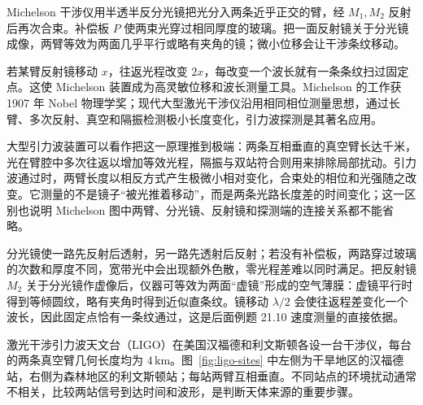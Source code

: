 Michelson 干涉仪用半透半反分光镜把光分入两条近乎正交的臂，经 $M_1,M_2$ 反射后再次合束。补偿板 $P$ 使两束光穿过相同厚度的玻璃。把一面反射镜关于分光镜成像，两臂等效为两面几乎平行或略有夹角的镜；微小位移会让干涉条纹移动。

若某臂反射镜移动 $x$，往返光程改变 $2x$，每改变一个波长就有一条条纹扫过固定点。这使 Michelson 装置成为高灵敏位移和波长测量工具。Michelson 的工作获 1907 年 Nobel 物理学奖；现代大型激光干涉仪沿用相同相位测量思想，通过长臂、多次反射、真空和隔振检测极小长度变化，引力波探测是其著名应用。

大型引力波装置可以看作把这一原理推到极端：两条互相垂直的真空臂长达千米，光在臂腔中多次往返以增加等效光程，隔振与双站符合则用来排除局部扰动。引力波通过时，两臂长度以相反方式产生极微小相对变化，合束处的相位和光强随之改变。它测量的不是镜子“被光推着移动”，而是两条光路长度差的时间变化；这一区别也说明 Michelson 图中两臂、分光镜、反射镜和探测端的连接关系都不能省略。

分光镜使一路先反射后透射，另一路先透射后反射；若没有补偿板，两路穿过玻璃的次数和厚度不同，宽带光中会出现额外色散，零光程差难以同时满足。把反射镜 $M_2$ 关于分光镜作虚像后，仪器可等效为两面“虚镜”形成的空气薄膜：虚镜平行时得到等倾圆纹，略有夹角时得到近似直条纹。镜移动 $\lambda/2$ 会使往返程差变化一个波长，因此固定点恰有一条纹通过，这是后面例题 21.10 速度测量的直接依据。

\MichelsonDiagram

激光干涉引力波天文台（LIGO）在美国汉福德和利文斯顿各设一台干涉仪，每台的两条真空臂几何长度均为 $4\,\mathrm{km}$。图~\ref{fig:ligo-sites} 中左侧为干旱地区的汉福德站，右侧为森林地区的利文斯顿站；每站两臂互相垂直。不同站点的环境扰动通常不相关，比较两站信号到达时间和波形，是判断天体来源的重要步骤。


\begin{center}\label{fig:ligomap}\end{center}

